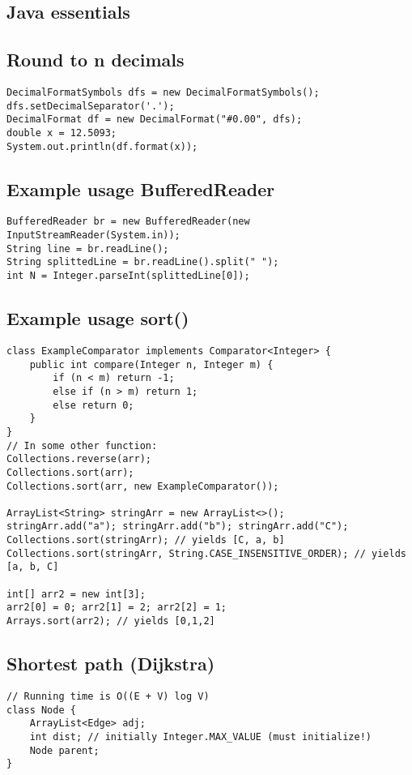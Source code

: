 \documentclass[9pt,a4paper,landscape,oneside]{amsart}
\begin{document}
\begin{multicols*}{3}
\section{Java essentials}
\subsection{Round to n decimals}
\begin{verbatim}
DecimalFormatSymbols dfs = new DecimalFormatSymbols();
dfs.setDecimalSeparator('.');
DecimalFormat df = new DecimalFormat("#0.00", dfs);
double x = 12.5093;
System.out.println(df.format(x));
\end{verbatim}

\subsection{Example usage BufferedReader}
\begin{verbatim}
BufferedReader br = new BufferedReader(new InputStreamReader(System.in));
String line = br.readLine();
String splittedLine = br.readLine().split(" ");
int N = Integer.parseInt(splittedLine[0]);
\end{verbatim}

\subsection{Example usage sort()}
\begin{verbatim}
class ExampleComparator implements Comparator<Integer> {
    public int compare(Integer n, Integer m) {
        if (n < m) return -1;
        else if (n > m) return 1;
        else return 0;
    }
}
// In some other function:
Collections.reverse(arr);
Collections.sort(arr);
Collections.sort(arr, new ExampleComparator());

ArrayList<String> stringArr = new ArrayList<>();
stringArr.add("a"); stringArr.add("b"); stringArr.add("C");
Collections.sort(stringArr); // yields [C, a, b]
Collections.sort(stringArr, String.CASE_INSENSITIVE_ORDER); // yields [a, b, C]

int[] arr2 = new int[3];
arr2[0] = 0; arr2[1] = 2; arr2[2] = 1;
Arrays.sort(arr2); // yields [0,1,2]
\end{verbatim}



\subsection{Shortest path (Dijkstra)}
\begin{verbatim}
// Running time is O((E + V) log V)
class Node {
    ArrayList<Edge> adj;
    int dist; // initially Integer.MAX_VALUE (must initialize!)
    Node parent;
}



\end{verbatim}
\end{multicols*}
\end{document}
